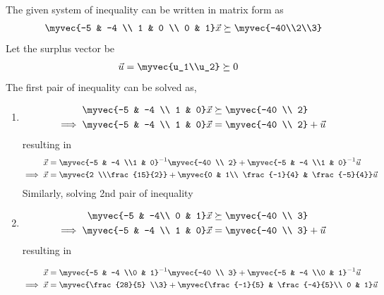 The given system of inequality can be written in matrix form as
\begin{align}
    \myvec{-5 & -4 \\ 1 & 0 \\ 0 & 1}\vec{x} \succeq \myvec{-40\\2\\3}
\end{align}
Let the surplus vector be
\begin{align}
    \vec{u} &= \myvec{u_1\\u_2} \succeq 0
\end{align}
The first pair of inequality can be solved as,
\begin{enumerate}
    \item 
    \begin{align}
        \myvec{-5 & -4 \\ 1 & 0}\vec{x} &\succeq \myvec{-40 \\ 2}
        \\
        \implies  \myvec{-5 & -4 \\ 1 & 0}\vec{x} &= \myvec{-40 \\ 2} + \vec{u}
    \end{align}
    resulting in 
    \begin{align}
        \vec{x} &= \myvec{-5 & -4 \\1 & 0}^{-1}\myvec{-40 \\ 2} + \myvec{-5 & -4 \\1 & 0}^{-1}\vec{u}
        \\
        \implies \vec{x} &= \myvec{2 \\\frac{15}{2}} + \myvec{0 & 1\\ \frac{-1}{4} & \frac{-5}{4}}\vec{u}   \label{aug/2/2eq1}
    \end{align}
    Similarly, solving 2nd pair of inequality
    \item 
    
    \begin{align}
        \myvec{-5 & -4\\ 0 & 1}\vec{x} &\succeq \myvec{-40 \\ 3}
        \\
        \implies  \myvec{-5 & -4 \\ 1 & 0}\vec{x} &= \myvec{-40 \\ 3} + \vec{u}
    \end{align}
    resulting in 
    
    \begin{align}
        \vec{x} &= \myvec{-5 & -4 \\0 & 1}^{-1}\myvec{-40 \\ 3} + \myvec{-5 & -4 \\0 & 1}^{-1}\vec{u}
        \\
        \implies \vec{x} &= \myvec{\frac{28}{5} \\3} + \myvec{\frac{-1}{5} & \frac{-4}{5}\\ 0 & 1}\vec{u} \label{aug/2/2eq2}
    \end{align}
    
\end{enumerate}
